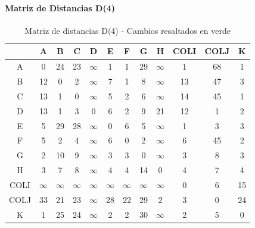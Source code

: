 \documentclass[12pt]{article}
\begin{document}
\paragraph{Matriz de Distancias D(4)}
\begin{table}[h!]
\centering
\begin{tabular}{|c|c|c|c|c|c|c|c|c|c|c|c|}
\hline
 & A & B & C & D & E & F & G & H & COLI & COLJ & K \\\hline
A & 0 & 24 & 23 & $\infty$ & 1 & 1 & 29 & $\infty$ & 1 & 68 & 1 \\\hline
B & 12 & 0 & 2 & $\infty$ & 7 & 1 & 8 & $\infty$ & 13 & 47 & 3 \\\hline
C & 13 & 1 & 0 & $\infty$ & 5 & 2 & 6 & $\infty$ & 14 & 45 & 1 \\\hline
D & 13 & 1 & 3 & 0 & 6 & 2 & 9 & 21 & 12 & 1 & 2 \\\hline
E & 5 & 29 & 28 & $\infty$ & 0 & 6 & 5 & $\infty$ & 1 & 3 & 3 \\\hline
F & 5 & 2 & 4 & $\infty$ & 6 & 0 & 2 & $\infty$ & 6 & 45 & 2 \\\hline
G & 2 & 10 & 9 & $\infty$ & 3 & 3 & 0 & $\infty$ & 3 & 8 & 3 \\\hline
H & 3 & 7 & 8 & $\infty$ & 4 & 4 & 14 & 0 & 4 & 7 & 4 \\\hline
COLI & $\infty$ & $\infty$ & $\infty$ & $\infty$ & $\infty$ & $\infty$ & $\infty$ & $\infty$ & 0 & 6 & 15 \\\hline
COLJ & 33 & 21 & 23 & $\infty$ & 28 & 22 & 29 & 2 & 3 & 0 & 24 \\\hline
K & 1 & 25 & 24 & $\infty$ & 2 & 2 & 30 & $\infty$ & 2 & 5 & 0 \\\hline
\end{tabular}
\caption{Matriz de distancias D(4) - Cambios resaltados en verde}
\end{table}
\end{document}
